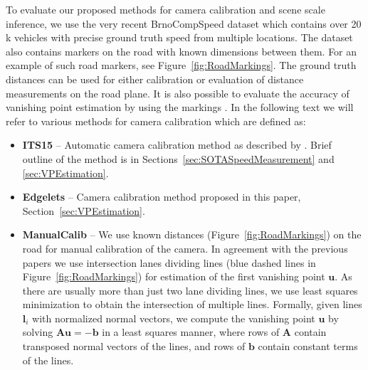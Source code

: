 \documentclass[]{elsarticle}
\newcommand{\ITSCalib}{ITS15}
\newcommand{\EdgeLetsCalib}{Edgelets}
\newcommand{\ManualCalib}{ManualCalib}
\begin{document}
To evaluate our proposed methods for camera calibration and scene scale inference, we use the very recent BrnoCompSpeed dataset \citep{BrnoCompSpeed} which contains over 20\,k vehicles with precise ground truth speed from multiple locations. The dataset also contains markers on the road with known dimensions between them. For an example of such road markers, see Figure~\ref{fig:RoadMarkings}. The ground truth distances can be used for either calibration or evaluation of distance measurements on the road plane. It is also possible to evaluate the accuracy of vanishing point estimation by using the markings \citep{BrnoCompSpeed}. In the following text we will refer to various methods for camera calibration which are defined as: 
\begin{itemize}
	\item \textbf{\ITSCalib} -- Automatic camera calibration method as described by \cite{Dubska2015ITS}. Brief outline of the method is in Sections~\ref{sec:SOTASpeedMeasurement} and \ref{sec:VPEstimation}.
	\item \textbf{\EdgeLetsCalib} -- Camera calibration method proposed in this paper, Section~\ref{sec:VPEstimation}.
	\item \textbf{\ManualCalib} -- We use known distances (Figure~\ref{fig:RoadMarkings}) on the road for manual calibration of the camera. In agreement with the previous papers \citep{Cathey2005,Grammatikopoulos2005,He2007CalibMethod} we use intersection lanes dividing lines (blue dashed lines in Figure~\ref{fig:RoadMarkings}) for estimation of the first vanishing point $\mathbf{u}$. As there are usually more than just two lane dividing lines, we use least squares minimization to obtain the intersection of multiple lines. Formally, given lines $\mathbf{l}_i$ with normalized normal vectors, we compute the vanishing point $\mathbf{u}$ by solving $\mathbf{A} \mathbf{u} = -\mathbf{b}$ in a least squares manner, where rows of $\mathbf{A}$ contain transposed normal vectors of the lines, and rows of $\mathbf{b}$ contain constant terms of the lines. 
	

\end{itemize}
\end{document}

